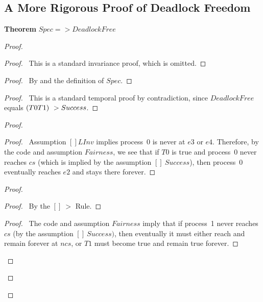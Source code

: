 \documentclass[fleqn,leqno]{article}
\begin{document}
\subsection*{A More Rigorous Proof of Deadlock Freedom}

\vspace{.4em}

\pflongnumbers
\pflongindent
\beforePfSpace{10pt, 5pt, 2pt}
\afterPfSpace{10pt, 10pt, 5pt}
\interStepSpace{.5pt}
\noindent
\textbf{Theorem } $Spec => DeadlockFree$


\begin{proof}

\begin{proof}
\pf\ This is a standard invariance proof, which is omitted.
\end{proof}

\begin{proof}
 \pf\ By  and the definition of $Spec$.
\end{proof}

\begin{proof}
\pf\ This is a standard temporal proof by contradiction,
since $DeadlockFree$ equals $(T0 \/ T1) ~> Success$.
\end{proof}

\begin{proof}

  \begin{proof}
  \pf\ Assumption $[]LInv$ implies process~0 is never at $e3$ or $e4$.  
  Therefore, by the code 
and assumption $Fairness$, we see that if $T0$ is true and
  process~0 never reaches $cs$ (which is implied by the assumption 
  $[]~Success$), then process~0 eventually reaches $e2$
  and stays there forever.
  \end{proof}

 \begin{proof}
    \begin{proof}
    \pf\ By the $[]~>$ Rule.
    \end{proof}
   \begin{proof}
    \pf\ The code and assumption $Fairness$ imply that if 
     process~1 never reaches 
     $cs$ (by the assumption $[]~Success)$, then eventually it 
     must either reach 
     and remain forever 
     at $ncs$, or $T1$ must become true and remain true forever.
   \end{proof}


\end{proof}
\end{proof}
\end{proof}
\end{document}
